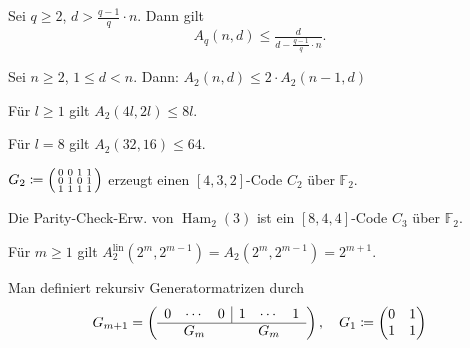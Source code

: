\documentclass{cheat-sheet}
\newcommand{\F}{\mathbb{F}} %
\newcommand{\lin}{\text{lin}} %
\DeclareMathOperator{\Ham}{Ham} %
\begin{document}
\begin{satz}
  Sei $q \geq 2$, $d > \tfrac{q-1}{q} \cdot n$.
  Dann gilt
  \[ A_q(n, d) \leq \tfrac{d}{d - \tfrac{q-1}{q} \cdot n}. \]
\end{satz}

\begin{lem}
  Sei $n \geq 2$, $1 \leq d < n$.
  Dann: $A_2(n, d) \leq 2 \cdot A_2(n-1, d)$
\end{lem}

\begin{satz}
  Für $l \geq 1$ gilt $A_2(4 l, 2 l) \leq 8 l$.
\end{satz}

\begin{bsp}
  Für $l=8$ gilt $A_2(32, 16) \leq 64$.
\end{bsp}

\begin{bsp}
  $G_2 \coloneqq \begin{psmallmatrix}
    0 & 0 & 1 & 1 \\
    0 & 1 & 0 & 1 \\
    1 & 1 & 1 & 1
  \end{psmallmatrix}$
  erzeugt einen $[4, 3, 2]$-Code $C_2$ über $\F_2$.
\end{bsp}

\begin{bsp}
  Die Parity-Check-Erw. von $\Ham_2(3)$ ist ein $[8, 4, 4]$-Code $C_3$ über $\F_2$.
\end{bsp}

\iffalse
\begin{kor}
  $A_2(4, 2) = A_2^\lin(4, 2) = 8$, \enspace
  $A_2(8, 4) = A_2^\lin(8, 4) = 16$
\end{kor}
\fi

\begin{satz}
  Für $m \geq 1$ gilt $A_2^\lin(2^m, 2^{m-1}) = A_2(2^m, 2^{m-1}) = 2^{m+1}$.
\end{satz}

\begin{konstr}
  Man definiert rekursiv Generatormatrizen durch
  \[
    G_{m+1} = \left( \begin{array}{c c c | c c c}
      0 & \cdots & 0 & 1 & \cdots & 1 \\ \hline
      \multicolumn{3}{c}{G_m} & \multicolumn{3}{c}{G_m}
    \end{array} \right), \quad
    G_1 \coloneqq \begin{pmatrix}
      0 & 1 \\
      1 & 1
    \end{pmatrix}
  \]
\end{konstr}
\end{document}

